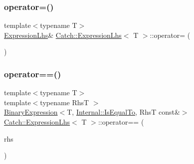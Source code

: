 \subsubsection{\texorpdfstring{operator=()}{operator=()}}
{\footnotesize\ttfamily template$<$typename T$>$ \\
\mbox{\hyperlink{class_catch_1_1_expression_lhs}{Expression\+Lhs}}\& \mbox{\hyperlink{class_catch_1_1_expression_lhs}{Catch\+::\+Expression\+Lhs}}$<$ T $>$\+::operator= (\begin{DoxyParamCaption}\item[{const \mbox{\hyperlink{class_catch_1_1_expression_lhs}{Expression\+Lhs}}$<$ T $>$ \&}]{ }\end{DoxyParamCaption})}

\mbox{\label{class_catch_1_1_expression_lhs_abebe4afc079c91ae548ab8fdba6c77f2}} 
\subsubsection{\texorpdfstring{operator==()}{operator==()}\hspace{0.1cm}{\footnotesize\ttfamily [1/2]}}
{\footnotesize\ttfamily template$<$typename T$>$ \\
template$<$typename RhsT $>$ \\
\mbox{\hyperlink{class_catch_1_1_binary_expression}{Binary\+Expression}}$<$T, \mbox{\hyperlink{namespace_catch_1_1_internal_ae3f96598a7858155750bf38e7295d83ea30e0accba6ec8384f4383b04dd2a6a9e}{Internal\+::\+Is\+Equal\+To}}, RhsT const\&$>$ \mbox{\hyperlink{class_catch_1_1_expression_lhs}{Catch\+::\+Expression\+Lhs}}$<$ T $>$\+::operator== (\begin{DoxyParamCaption}\item[{RhsT const \&}]{rhs }\end{DoxyParamCaption})\hspace{0.3cm}{\ttfamily [inline]}}

\mbox{\label{class_catch_1_1_expression_lhs_ab803185079504a65b0af95f7c9669351}} 

